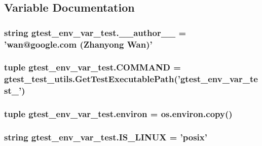 \subsection{Variable Documentation}
\hypertarget{namespacegtest__env__var__test_a8a712438470c76f2144c66dcee28e326}{
\subsubsection[{\-\_\-\-\_\-author\-\_\-\-\_\-}]{\setlength{\rightskip}{0pt plus 5cm}string gtest\-\_\-env\-\_\-var\-\_\-test.\-\_\-\-\_\-author\-\_\-\-\_\- = 'wan@google.\-com (Zhanyong Wan)'}}\label{namespacegtest__env__var__test_a8a712438470c76f2144c66dcee28e326}
\hypertarget{namespacegtest__env__var__test_a6c739e8ac3f4f184d9351af775d26496}{
\subsubsection[{C\-O\-M\-M\-A\-N\-D}]{\setlength{\rightskip}{0pt plus 5cm}tuple gtest\-\_\-env\-\_\-var\-\_\-test.\-C\-O\-M\-M\-A\-N\-D = {\bf gtest\-\_\-test\-\_\-utils.\-Get\-Test\-Executable\-Path}('gtest\-\_\-env\-\_\-var\-\_\-test\-\_\-')}}\label{namespacegtest__env__var__test_a6c739e8ac3f4f184d9351af775d26496}
\hypertarget{namespacegtest__env__var__test_a5cfdb73835d2006b40151861d9fd1e7c}{
\subsubsection[{environ}]{\setlength{\rightskip}{0pt plus 5cm}tuple gtest\-\_\-env\-\_\-var\-\_\-test.\-environ = os.\-environ.\-copy()}}\label{namespacegtest__env__var__test_a5cfdb73835d2006b40151861d9fd1e7c}
\hypertarget{namespacegtest__env__var__test_a33b1e2e9afe9d59d75503de4a1297486}{
\subsubsection[{I\-S\-\_\-\-L\-I\-N\-U\-X}]{\setlength{\rightskip}{0pt plus 5cm}string gtest\-\_\-env\-\_\-var\-\_\-test.\-I\-S\-\_\-\-L\-I\-N\-U\-X = 'posix'}}\label{namespacegtest__env__var__test_a33b1e2e9afe9d59d75503de4a1297486}

